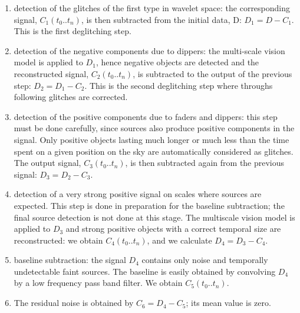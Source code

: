 \begin{enumerate}
\item detection of the glitches of the first type in wavelet
space: the corresponding signal, $C_1(t_0..t_n)$, is then subtracted
from the initial data, D: $D_1 = D - C_1$. This is the first deglitching step.
\item detection of the negative components due to dippers: the
multi-scale vision model is applied to $D_1$, hence negative objects
are detected and the reconstructed signal, $C_2(t_0..t_n)$, is  
subtracted to the output of the previous step: $D_2 = D_1 -
C_2$. This is the second deglitching step where throughs following
glitches are corrected.
\item detection of the positive components due to faders and dippers:
this step must be done carefully, since sources also produce positive
components in the signal. Only positive objects lasting much longer
or much less than the time spent on a given position  on
the sky are automatically
considered as glitches. The output signal, $C_3(t_0..t_n)$, is then
subtracted again from the previous signal: $D_3 = D_2 - C_3$.
\item detection of a very strong positive signal on scales where
sources are expected. This step is done in preparation for the baseline
subtraction; the final source detection is not done at this stage.
The multiscale vision model is applied to $D_3$ and
strong positive objects with a correct temporal size are
reconstructed: we obtain $C_4(t_0..t_n)$, and we calculate $D_4 = D_3 -
C_4$.
\item baseline subtraction: the signal $D_4$ contains only noise and 
temporally undetectable faint sources. 
The baseline is easily obtained by convolving $D_4$ by
a low frequency pass band filter. 
We obtain  $C_5(t_0..t_n)$.
\item The residual noise is obtained by $C_6 = D_4 - C_5$; its mean value is 
zero.
\end{enumerate}

